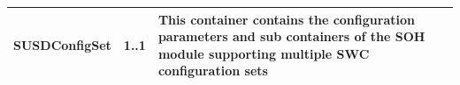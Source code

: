 \begin{longtable}{|l|l|l|}
\begin{minipage}{0.25\linewidth}\raggedright\vspace{.75ex}SUSDConfigSet\vspace{.75ex}\end{minipage} & \begin{minipage}{0.17\linewidth}\raggedright\vspace{.75ex}1..1\vspace{.75ex}\end{minipage} & \begin{minipage}{0.50\linewidth}\raggedright\vspace{.75ex}This container contains the configuration parameters and sub containers of the SOH module supporting multiple SWC configuration sets\vspace{.75ex}\end{minipage}\\\hline
\end{longtable}